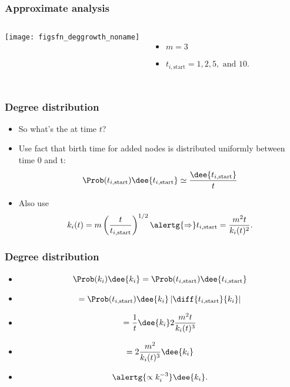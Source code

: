 \begin{frame}[label=]
 \frametitle{Approximate analysis}  

 \begin{block}{}
 \begin{columns}
   \texttt{[image: figsfn\_deggrowth\_noname]}
   \begin{itemize}
   \item $m = 3$
   \item $t_{i,\textrm{start}} = 1, 2, 5, \mbox{\ and\ } 10$.
   \end{itemize}
 \end{columns}
 \end{block}

\end{frame}

\begin{frame}[label=]
 \frametitle{Degree distribution}

 \begin{block}{}
 \begin{itemize}
 \item<1-> 
   So what's the  at time $t$?
 \item<2-> 
   Use fact that birth time for added nodes
   is distributed uniformly between time 0 and t:
   $$
   \Prob(t_{i,\textrm{start}}) \dee{t_{i,\textrm{start}}}
   \simeq
   \frac{\dee{t_{i,\textrm{start}}}}
   {t}
   $$
 \item<3->
   Also use
   $$
   k_i(t) 
   = 
   m 
   \left(
   \frac{t}{t_{i,\textrm{start}}}
   \right)^{1/2}
   \alertg{\Rightarrow}
   t_{i,\textrm{start}}
   = \frac{m^2 t}{k_i(t)^2}.
   $$
 \end{itemize}
 \end{block}

\end{frame}

\begin{frame}[label=]
  \frametitle{Degree distribution}

  \begin{block}{}
  \begin{itemize}
  \item<1-> 
    $$
    \Prob(k_i) \dee{k_i} =  \Prob(t_{i,\textrm{start}}) \dee{t_{i,\textrm{start}}}
    $$
  \item<2-> 
    $$
    = \Prob(t_{i,\textrm{start}}) \dee{k_i} \left| \diff{t_{i,\textrm{start}}}{k_i} \right|
    $$
  \item<3-> 
    $$
    = \frac{1}{t} \dee{k_i} 2 \frac{m^2 t}{k_i(t)^3}
    $$
  \item<4-> 
    $$
    = 2 \frac{m^2 }{k_i(t)^3}  \dee{k_i}
    $$
  \item<5-> 
    $$
    \alertg{\propto k_i^{-3}} \dee{k_i}.
    $$
  \end{itemize}
  \end{block}

\end{frame}

